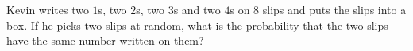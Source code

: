 Kevin writes two $1$s, two $2$s, two $3$s and two $4$s on $8$ slips and puts the slips into a box. If he picks two slips at random, what is the probability that the two slips have the same number written on them?
